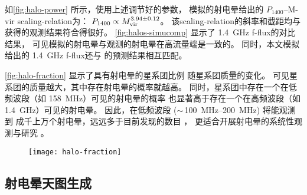 如\autoref{fig:halo-power} 所示，使用上述调节好的参数，
模拟的射电晕给出的 $P_{1400}$--\ac{M-vir} \ac{scaling-relation}为：
$P_{1400} \propto M_{\mathrm{vir}}^{3.94 \pm 0.12}$。
该\ac{scaling-relation}的斜率和截距均与 
获得的观测结果符合得很好。
\autoref{fig:halos-simucomp} 显示了 \SI{1.4}{\GHz} \ac{f-flux}的对比结果，
可见模拟的射电晕与观测的射电晕在高流量端是一致的。
同时，本文模拟给出的 \SI{1.4}{\GHz} \ac{f-flux}还与
 的预测结果相互匹配。

\autoref{fig:halo-fraction} 显示了具有射电晕的星系团比例
随星系团质量的变化。
可见星系团的质量越大，其中存在射电晕的概率就越高。
同时，星系团中存在一个在低频波段（如 \SI{158}{\MHz}）可见的射电晕的概率
也显著高于存在一个在高频波段（如 \SI{1.4}{\GHz}）可见的射电晕。
因此，在低频波段 ($\sim$\,\SIrange{100}{200}{\MHz}) 将能观测到
成千上万个射电晕，远远多于目前发现的数目 \cite{cassano2012,cassano2015}，
更适合开展射电晕的系统性观测与研究 \cite{kale2016}。

\begin{figure}[htp]
  \centering
  \texttt{[image: halo-fraction]}
  \label{fig:halo-fraction}
\end{figure}

\subsection{射电晕天图生成}
\label{sec:halo-maps}

